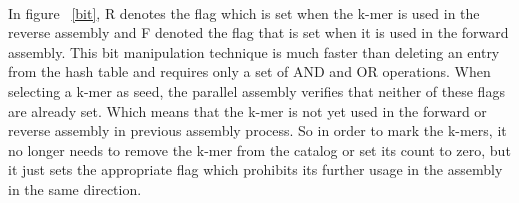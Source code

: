 \label{key}\documentclass[bachinf, english ,zihtitle,final,hyperref,utf8]{zihpub}
\begin{document}
\paragraph{}
In figure ~\ref{bit}, R denotes the flag which is set when the k-mer is used in the reverse assembly and F denoted the flag that is set when it is used in the forward assembly. This bit manipulation technique is much faster than deleting an entry from the hash table and requires only a set of AND and OR operations. When selecting a k-mer as seed, the parallel assembly verifies that neither of these flags are already set. Which means that the k-mer is not yet used in the forward or reverse assembly in previous assembly process. So in order to mark the k-mers, it no longer needs to remove the k-mer from the catalog or set its count to zero, but it just sets the appropriate flag which prohibits its further usage in the assembly in the same direction.
\end{document}
